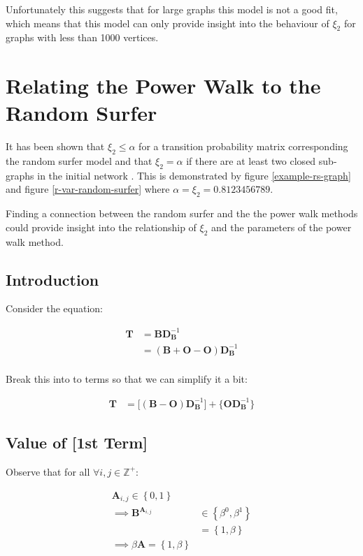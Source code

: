 \documentclass[11pt]{report}
\begin{document}
Unfortunately this suggests that for large graphs this model is not a good fit,
which means that this model can only provide insight into the behaviour of
\(\xi_{2}\) for graphs with less than 1000 vertices.

\section{Relating the Power Walk to the Random Surfer}
\label{relate-to-random-surfer}
It has been shown that \(\xi_{2} \leq \alpha\) for a transition probability matrix corresponding the random surfer model and that \(\xi_{2} = \alpha\) if there are at least two closed sub-graphs in the initial network \cite{haveliwalaSecondEigenvalueGoogle2003}. This is demonstrated by figure \ref{example-rs-graph} and figure \ref{r-var-random-surfer} where \(\alpha = \xi_{2} = 0.8123456789\).

Finding a connection between the random surfer and the the power walk methods could provide insight into the relationship of \(\xi_{2}\) and the parameters of the power walk method.

\subsection{Introduction}
\label{sec:org07b66b7}
Consider the equation:


\begin{align*}
\mathbf{T}&= \mathbf{B}\mathbf{D}_{\mathbf{B}}^{- 1} \\
&= \left( \mathbf{B}+  \mathbf{O} - \mathbf{O} \right) \mathbf{D}_{\mathbf{B}}^{- 1} \\
\end{align*}


Break this into to terms so that we can simplify it a bit:


\begin{align*}
    \mathbf{T} &= \Bigg[ \left( \mathbf{B}- \mathbf{O} \right)\mathbf{D}_{\mathbf{B}}^{- 1} \Bigg] + \Bigg\{  \mathbf{O}\mathbf{D}_{\mathbf{B}}^{- 1} \Bigg\}
\end{align*}
\subsection{Value of [1st Term]}
\label{value-of-1st-term}
Observe that for all \(\forall i,j\in \mathbb{Z}^+\):


\begin{align*}
\mathbf{A}_{i, j} \in \left\{0, 1\right\} \\
\implies  \mathbf{B}^{\mathbf{A}_{i, j}} &\in \left\{\beta^0, \beta^1\right\} \\
                     &= \left\{1, \beta \right\}  \\
                      \implies  \beta \mathbf{A} = \left\{1, \beta \right\}
\end{align*}
\end{document}
